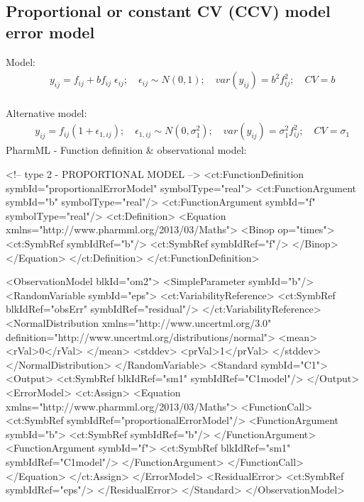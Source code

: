 \documentclass[a4paper,10pt]{article}
\begin{document}
\subsection{Proportional or constant CV (CCV) model error model}
\label{model2}
Model:
\begin{eqnarray}
&& y_{ij} =  f_{ij} + bf_{ij} \; \epsilon_{ij}; \quad \epsilon_{ij} \sim N(0,1); \quad \mathit{var}(y_{ij}) = b^2f_{ij}^2; \quad \mathit{CV} = b \nonumber
\end{eqnarray}
\\
Alternative model:
\begin{eqnarray}
&& y_{ij} =  f_{ij}(1+\epsilon_{1,ij}); \quad \epsilon_{1,ij} \sim N(0,\sigma_1^2); \quad
\mathit{var}(y_{ij}) =  \sigma_1^2 f_{ij}^2; \quad \mathit{CV} = \sigma_1 \nonumber
\end{eqnarray}
PharmML - Function definition \& observational model:
\begin{xmlcode}
<!-- type 2 - PROPORTIONAL MODEL -->
<ct:FunctionDefinition symbId="proportionalErrorModel" symbolType="real">
    <ct:FunctionArgument symbId="b" symbolType="real"/>
    <ct:FunctionArgument symbId="f" symbolType="real"/>
    <ct:Definition>
        <Equation xmlns="http://www.pharmml.org/2013/03/Maths">
            <Binop op="times">
                <ct:SymbRef symbIdRef="b"/>
                <ct:SymbRef symbIdRef="f"/>
            </Binop>
        </Equation>
    </ct:Definition>
</ct:FunctionDefinition>

<ObservationModel blkId="om2">
    <SimpleParameter symbId="b"/>
    <RandomVariable symbId="eps">
        <ct:VariabilityReference>
            <ct:SymbRef blkIdRef="obsErr" symbIdRef="residual"/>
        </ct:VariabilityReference>
        <NormalDistribution xmlns="http://www.uncertml.org/3.0" definition="http://www.uncertml.org/distributions/normal">
            <mean>
                <rVal>0</rVal>
            </mean>
            <stddev>
                <prVal>1</prVal>
            </stddev>
        </NormalDistribution>
    </RandomVariable>
    <Standard symbId="C1">
        <Output>
            <ct:SymbRef blkIdRef="sm1" symbIdRef="C1model"/>
        </Output>
        <ErrorModel>
            <ct:Assign>
                <Equation xmlns="http://www.pharmml.org/2013/03/Maths">
                    <FunctionCall>
                        <ct:SymbRef symbIdRef="proportionalErrorModel"/>
                        <FunctionArgument symbId="b">
                            <ct:SymbRef symbIdRef="b"/>
                        </FunctionArgument>
                        <FunctionArgument symbId="f">
                            <ct:SymbRef blkIdRef="sm1" symbIdRef="C1model"/>
                        </FunctionArgument>
                    </FunctionCall>
                </Equation>
            </ct:Assign>
        </ErrorModel>
        <ResidualError>
            <ct:SymbRef symbIdRef="eps"/>
        </ResidualError>
    </Standard>
</ObservationModel>
\end{xmlcode}
\end{document}
